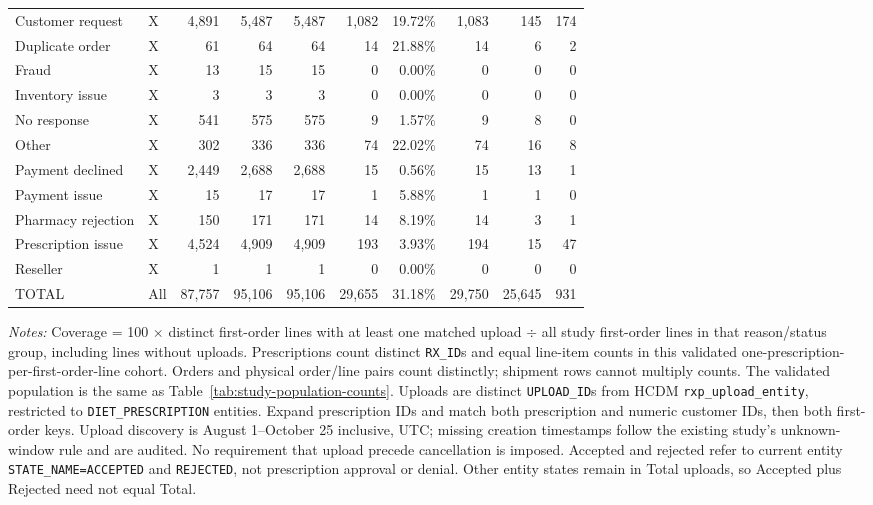\begin{landscape}
\begin{table}[!htbp]
\begin{tabular}{@{}llrrrrrrrr@{}}
{Customer request} & X & 4,891 & 5,487 & 5,487 & 1,082 & 19.72\% & 1,083 & 145 & 174 \\
{Duplicate order} & X & 61 & 64 & 64 & 14 & 21.88\% & 14 & 6 & 2 \\
{Fraud} & X & 13 & 15 & 15 & 0 & 0.00\% & 0 & 0 & 0 \\
{Inventory issue} & X & 3 & 3 & 3 & 0 & 0.00\% & 0 & 0 & 0 \\
{No response} & X & 541 & 575 & 575 & 9 & 1.57\% & 9 & 8 & 0 \\
{Other} & X & 302 & 336 & 336 & 74 & 22.02\% & 74 & 16 & 8 \\
{Payment declined} & X & 2,449 & 2,688 & 2,688 & 15 & 0.56\% & 15 & 13 & 1 \\
{Payment issue} & X & 15 & 17 & 17 & 1 & 5.88\% & 1 & 1 & 0 \\
{Pharmacy rejection} & X & 150 & 171 & 171 & 14 & 8.19\% & 14 & 3 & 1 \\
{Prescription issue} & X & 4,524 & 4,909 & 4,909 & 193 & 3.93\% & 194 & 15 & 47 \\
{Reseller} & X & 1 & 1 & 1 & 0 & 0.00\% & 0 & 0 & 0 \\
\midrule
{TOTAL} & All & 87,757 & 95,106 & 95,106 & 29,655 & 31.18\% & 29,750 & 25,645 & 931 \\
\bottomrule
\end{tabular}
\begin{minipage}{\linewidth}
\footnotesize
\textit{Notes:} Coverage = 100 $\times$ distinct first-order lines with at least
one matched upload $\div$ all study first-order lines in that reason/status group, including
lines without uploads. Prescriptions count distinct \texttt{RX\_ID}s and equal
line-item counts in this validated one-prescription-per-first-order-line cohort.
Orders and physical order/line pairs count distinctly;
shipment rows cannot multiply counts. The validated population is the same as
Table~\ref{tab:study-population-counts}.
Uploads are distinct \texttt{UPLOAD\_ID}s from HCDM
\texttt{rxp\_upload\_entity}, restricted to \texttt{DIET\_PRESCRIPTION} entities.
Expand prescription IDs and match both prescription and numeric customer IDs,
then both first-order keys. Upload discovery is August 1--October 25 inclusive,
UTC; missing creation timestamps follow the existing study's unknown-window rule
and are audited. No requirement that upload precede cancellation is imposed.
Accepted and rejected refer to current entity \texttt{STATE\_NAME=ACCEPTED} and
\texttt{REJECTED}, not prescription approval or denial. Other entity states
remain in Total uploads, so Accepted plus Rejected need not equal Total.

\end{minipage}
\end{table}
\end{landscape}
